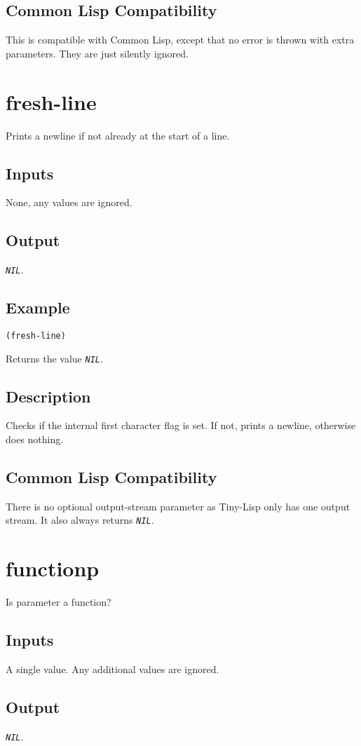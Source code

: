 \documentclass[10pt, openany]{book}
\newcommand{\constant}[1]{\emph{\texttt{#1}}}
\newcommand{\tl}{Tiny-Lisp}
\newcommand{\cl}{Common Lisp}
\begin{document}
\subsection{Common Lisp Compatibility}
This is compatible with \cl, except that no error is thrown with extra parameters.  They are just silently ignored.

\section{fresh-line}
Prints a newline if not already at the start of a line.
\subsection{Inputs}
None, any values are ignored.
\subsection{Output}
\constant{NIL}.
\subsection{Example}
\begin{lstlisting}
(fresh-line)
\end{lstlisting}
Returns the value \constant{NIL}.
\subsection{Description}
Checks if the internal first character flag is set.  If not, prints a newline, otherwise does nothing.
\subsection{Common Lisp Compatibility}
There is no optional output-stream parameter as \tl{} only has one output stream.  It also always returns \constant{NIL}.

\section{functionp}
Is parameter a function?
\subsection{Inputs}
A single value.  Any additional values are ignored.
\subsection{Output}
\constant{NIL}.
\end{document}
